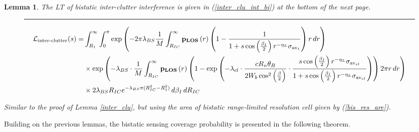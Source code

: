 \documentclass[journal]{IEEEtran}
\newtheorem{lemma}{\textbf{Lemma}}
\begin{document}
\begin{lemma} \label{inter_clu_b}
The LT of bistatic inter-clutter interference is given in (\ref{inter_clu_int_bi}) at the bottom of the next page.
\begin{figure*}[b]
\hrule
\begin{equation}\label{inter_clu_int_bi}
\begin{aligned}
\mathcal{L}_{\text{inter-clutter}}(s) = & \int_{R_1}^{\infty} \int_{0}^{\pi} 
\exp \left( - 2 \pi \lambda_{BS} \frac{1}{M} \int_{R_{IC}}^{\infty} \bold p_{\bold{LOS}}\left(r\right)  \left( 1 - \frac{1}{1 + s \cos\left( \frac{\beta_I}{2} \right) r^{-\eta_L} \sigma_{\text{av}_t}} \right) r \, dr \right) \\
& \times \exp \left( - \lambda_{BS} \cdot \frac{1}{M} \int_{R_{IC}}^{\infty}  \bold p_{\bold{LOS}}\left(r\right)  \left( 1 - \exp \left( - \lambda_{cl} \cdot \frac{c  R_n  \theta_B}{2 W_b\cos^2\left(\frac{\beta}{2}\right)} \cdot \frac{s \cos \left( \frac{\beta_I}{2} \right) r^{-\eta_L} \sigma_{\text{av}_{cl}}}{1 + s \cos \left( \frac{\beta_I}{2} \right) r^{-\eta_L} \sigma_{\text{av}_{cl}}} \right) \right) 2 \pi r \, dr \right) \\
& \times 2 \lambda_{BS}  R_{IC} e^{-\lambda_{BS} \pi (R_{IC}^2 - R_1^2)}  \,  d\beta_I  \, dR_{IC}
\end{aligned}
\end{equation}
\end{figure*}
\begin{IEEEproof}
Similar to the proof of Lemma \ref{inter_clu}, but using the area of bistatic range-limited resolution cell given by (\ref{bis_res_are}).
\end{IEEEproof}
\end{lemma}
Building on the previous lemmas, the bistatic sensing
coverage probability is presented in the following theorem.
\end{document}
